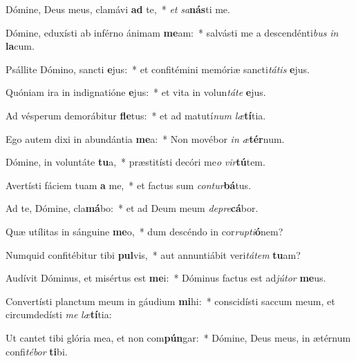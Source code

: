 \item Dómine, Deus meus, clamávi \textbf{ad} te,~* \textit{et} \textit{sa}\textbf{nás}ti me.
\item Dómine, eduxísti ab inférno ánimam \textbf{me}am:~* salvásti me a descendénti\textit{bus} \textit{in} \textbf{la}cum.
\item Psállite Dómino, sancti \textbf{e}jus:~* et confitémini memóriæ sancti\textit{tá}\textit{tis} \textbf{e}jus.
\item Quóniam ira in indignatióne \textbf{e}jus:~* et vita in volun\textit{tá}\textit{te} \textbf{e}jus.
\item Ad vésperum demorábitur \textbf{fle}tus:~* et ad matutí\textit{num} \textit{læ}\textbf{tí}tia.
\item Ego autem dixi in abundántia \textbf{me}a:~* Non movébor \textit{in} \textit{æ}\textbf{tér}num.
\item Dómine, in voluntáte \textbf{tu}a,~* præstitísti decóri me\textit{o} \textit{vir}\textbf{tú}tem.
\item Avertísti fáciem tuam \textbf{a} me,~* et factus sum \textit{con}\textit{tur}\textbf{bá}tus.
\item Ad te, Dómine, cla\textbf{má}bo:~* et ad Deum meum \textit{de}\textit{pre}\textbf{cá}bor.
\item Quæ utílitas in sánguine \textbf{me}o,~* dum descéndo in cor\textit{rup}\textit{ti}\textbf{ó}nem?
\item Numquid confitébitur tibi \textbf{pul}vis,~* aut annuntiábit veri\textit{tá}\textit{tem} \textbf{tu}am?
\item Audívit Dóminus, et misértus est \textbf{me}i:~* Dóminus factus est ad\textit{jú}\textit{tor} \textbf{me}us.
\item Convertísti planctum meum in gáudium \textbf{mi}hi:~* conscidísti saccum meum, et circumdedísti \textit{me} \textit{læ}\textbf{tí}tia:
\item Ut cantet tibi glória mea, et non com\textbf{pún}gar:~* Dómine, Deus meus, in ætérnum confi\textit{té}\textit{bor} \textbf{ti}bi.
